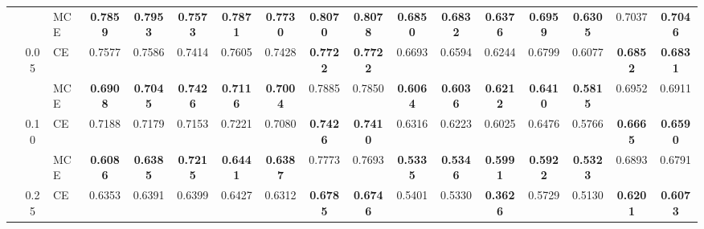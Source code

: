 \documentclass[sigconf,authordraft]{acmart}
\begin{document}
\begin{table*}
{\begin{tabular}{lcl|ccccccc|ccccccc}
                                &      & MCE &                         \textbf{0.7859} &         \textbf{0.7953} &     \textbf{0.7573} &         \textbf{0.7871} &  \textbf{0.7730} &              \textbf{0.8070} &              \textbf{0.8078} &                        \textbf{0.6850} &         \textbf{0.6832} &     \textbf{0.6376} &         \textbf{0.6959} &  \textbf{0.6305} &                       0.7037 &              \textbf{0.7046} \\
    \cline{2-17}
                                & \multirow{2}{*}{0.05} & CE &                                  0.7577 &                  0.7586 &              0.7414 &                  0.7605 &           0.7428 &              \textbf{0.7722} &              \textbf{0.7722} &                                 0.6693 &                  0.6594 &              0.6244 &                  0.6799 &           0.6077 &              \textbf{0.6852} &              \textbf{0.6831} \\
                                &      & MCE &                         \textbf{0.6908} &         \textbf{0.7045} &     \textbf{0.7426} &         \textbf{0.7116} &  \textbf{0.7004} &                       0.7885 &                       0.7850 &                        \textbf{0.6064} &         \textbf{0.6036} &     \textbf{0.6212} &         \textbf{0.6410} &  \textbf{0.5815} &                       0.6952 &                       0.6911 \\
    \cline{2-17}
                                & \multirow{2}{*}{0.10} & CE &                                  0.7188 &                  0.7179 &              0.7153 &                  0.7221 &           0.7080 &              \textbf{0.7426} &              \textbf{0.7410} &                                 0.6316 &                  0.6223 &              0.6025 &                  0.6476 &           0.5766 &              \textbf{0.6665} &              \textbf{0.6590} \\
                                &      & MCE &                         \textbf{0.6086} &         \textbf{0.6385} &     \textbf{0.7215} &         \textbf{0.6441} &  \textbf{0.6387} &                       0.7773 &                       0.7693 &                        \textbf{0.5335} &         \textbf{0.5346} &     \textbf{0.5991} &         \textbf{0.5922} &  \textbf{0.5323} &                       0.6893 &                       0.6791 \\
    \cline{2-17}
                                & \multirow{2}{*}{0.25} & CE &                                  0.6353 &                  0.6391 &              0.6399 &                  0.6427 &           0.6312 &              \textbf{0.6785} &              \textbf{0.6746} &                                 0.5401 &                  0.5330 &     \textbf{0.3626} &                  0.5729 &           0.5130 &              \textbf{0.6201} &              \textbf{0.6073} \\

\end{tabular}}
\end{table*}
\end{document}

